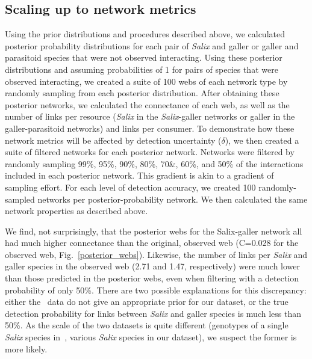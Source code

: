 \documentclass[12pt]{article}
\begin{document}
  \subsection*{Scaling up to network metrics}

    Using the prior distributions and procedures described above, we calculated posterior probability distributions for each pair of \emph{Salix} and galler or galler and parasitoid species that were not observed interacting. Using these posterior distributions and assuming probabilities of 1 for pairs of species that were observed interacting, we created a suite of 100 webs of each network type by randomly sampling from each posterior distribution. After obtaining these posterior networks, we calculated the connectance of each web, as well as the number of links per resource (\emph{Salix} in the \emph{Salix}-galler networks or galler in the galler-parasitoid networks) and links per consumer. To demonstrate how these network metrics will be affected by detection uncertainty ($\delta$), we then created a suite of filtered networks for each posterior network. Networks were filtered by randomly sampling 99\%, 95\%, 90\%, 80\%, 70\&, 60\%, and 50\% of the interactions included in each posterior network. This gradient is akin to a gradient of sampling effort. For each level of detection accuracy, we created 100 randomly-sampled networks per posterior-probability network. We then calculated the same network properties as described above.


    We find, not surprisingly, that the posterior webs for the Salix-galler network all had much higher connectance than the original, observed web (C=0.028 for the observed web, Fig.~\ref{posterior_webs}). Likewise, the number of links per \emph{Salix} and galler species in the observed web (2.71 and 1.47, respectively) were much lower than those predicted in the posterior webs, even when filtering with a detection probability of only 50\%. There are two possible explanations for this discrepancy: either the~\citet{Barbour2016} data do not give an appropriate prior for our dataset, or the true detection probability for links between \emph{Salix} and galler species is much less than 50\%. As the scale of the two datasets is quite different (genotypes of a single \emph{Salix} species in~\citet{Barbour2016}, various \emph{Salix} species in our dataset), we suspect the former is more likely.
\end{document}
